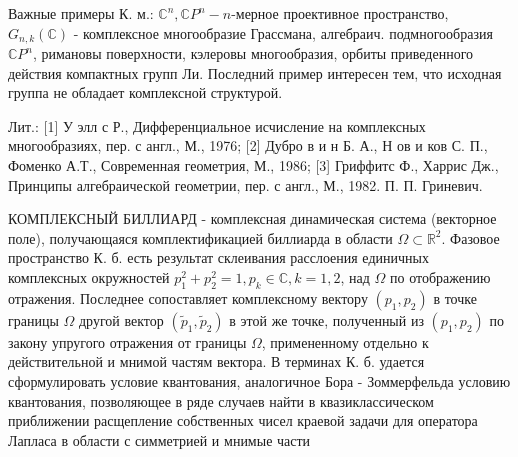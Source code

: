 \documentclass[10pt]{article}
\begin{document}
Важные примеры К. м.: $\mathbb{C}^{n}, \mathbb{C} P^{n}-n$-мерное проективное пространство, $G_{n, k}(\mathbb{C})$ - комплексное многообразие Грассмана, алгебраич. подмногообразия $\mathbb{C} P^{n}$, римановы поверхности, кэлеровы многообразия, орбиты приведенного действия компактных групп Ли. Последний пример интересен тем, что исходная группа не обладает комплексной структурой.



Лит.: [1] У элл с Р., Дифференциальное исчисление на комплексных многообразиях, пер. с англ., М., 1976; [2] Дубро в и н Б. А., Н ов и ков С. П., Фоменко А.Т., Современная геометрия, М., 1986; [3] Гриффитс Ф., Харрис Дж., Принципы алгебраической геометрии, пер. с англ., М., 1982. П. П. Гриневич.



КОМПЛЕКСНЫЙ БИЛЛИАРД - комплексная динамическая система (векторное поле), получающаяся комплектификацией биллиарда в области $\Omega \subset \mathbb{R}^{2}$. Фазовое пространство К. б. есть результат склеивания расслоения единичных комплексных окружностей $p_{1}^{2}+p_{2}^{2}=1, p_{k} \in \mathbb{C}, k=1,2$, над $\Omega$ по отображению отражения. Последнее сопоставляет комплексному вектору $\left(p_{1}, p_{2}\right)$ в точке границы $\Omega$ другой вектор $\left(\widetilde{p}_{1}, \widetilde{p}_{2}\right)$ в этой же точке, полученный из $\left(p_{1}, p_{2}\right)$ по закону упругого отражения от границы $\Omega$, примененному отдельно к действительной и мнимой частям вектора. В терминах К. б. удается сформулировать условие квантования, аналогичное Бора - Зоммерфельда условию квантования, позволяющее в ряде случаев найти в квазиклассическом приближении расщепление собственных чисел краевой задачи для оператора Лапласа в области с симметрией и мнимые части
\end{document}
